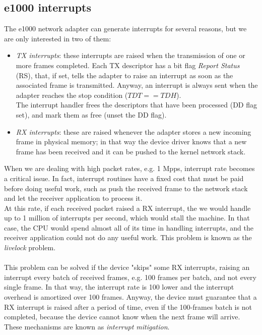 \documentclass[a4paper, 12pt, titlepage]{report}
\begin{document}
\subsection{e1000 interrupts} \label{subsec:e1000_interrupts}
The e1000 network adapter can generate interrupts for several reasons, but we are only interested in two of them:
\begin{itemize}
\item \textit{TX interrupts}: these interrupts are raised when the transmission of one or more frames completed. Each TX descriptor has a bit flag \textit{Report Status} (RS), that, if set, tells the adapter to raise an interrupt as soon as the associated frame is transmitted. Anyway, an interrupt is always sent when the adapter reaches the stop condition ($TDT == TDH$).
\\
The interrupt handler frees the descriptors that have been processed (DD flag set), and mark them as free (unset the DD flag).
\item \textit{RX interrupts}: these are raised whenever the adapter stores a new incoming frame in physical memory; in that way the device driver knows that a new frame has been received and it can be pushed to the kernel network stack.
\end{itemize}
When we are dealing with high packet rates, e.g. 1 Mpps, interrupt rate becomes a critical issue. In fact, interrupt routines have a fixed cost that must be paid before doing useful work, such as push the received frame to the network stack and let the receiver application to process it.
\\
At this rate, if each received packet raised a RX interrupt, the we would handle up to 1 million of interrupts per second, which would stall the machine. In that case, the CPU would spend almost all of its time in handling interrupts, and the receiver application could not do any useful work. This problem is known as the \textit{livelock} problem.
\\
\\
This problem can be solved if the device "skips" some RX interrupts, raising an interrupt every batch of received frames, e.g. 100 frames per batch, and not every single frame. In that way, the interrupt rate is 100 lower and the interrupt overhead is amortized over 100 frames. Anyway, the device must guarantee that a RX interrupt is raised after a period of time, even if the 100-frames batch is not completed, because the device cannot know when the next frame will arrive.
\\
These mechanisms are known as \textit{interrupt mitigation}. 
\end{document}
